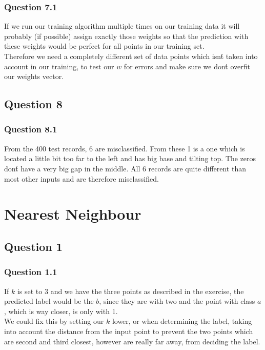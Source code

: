 \documentclass[11pt,twoside,a4paper]{article}
\begin{document}
	\subsection{Question 7.1}
	If we run our training algorithm multiple times on our training data it will probably (if possible) assign exactly those weights so that the prediction with these weights would be perfect for all points in our training set. \\
	Therefore we need a completely different set of data points which isn\'t taken into account in our training, to test our $w$ for errors and make sure we don\'t overfit our weights vector.
	
\section{Question 8}

	\subsection{Question 8.1}
	From the 400 test records, 6 are misclassified. From these 1 is a one which is located a little bit too far to the left and has big base and tilting top. The zeros don\'t have a very big gap in the middle. All 6 records are quite different than most other inputs and are therefore misclassified.

\chapter{Nearest Neighbour}

\section{Question 1}

	\subsection{Question 1.1}
	If $k$ is set to 3 and we have the three points as described in the exercise, the predicted label would be the $b$, since they are with two and the point with class $a$, which is way closer, is only with 1. \\
	We could fix this by setting our $k$ lower, or when determining the label, taking into account the distance from the input point to prevent the two points which are second and third closest, however are really far away, from deciding the label.
	
\end{document}
